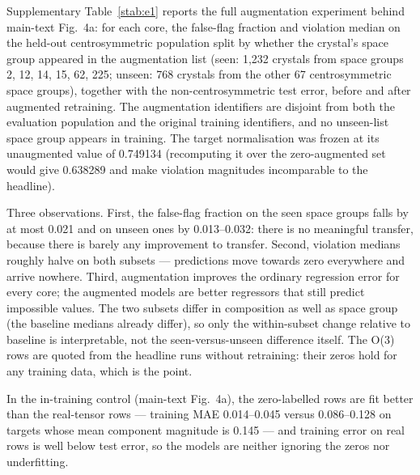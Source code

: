 Supplementary Table~\ref{stab:e1} reports the full augmentation experiment behind main-text Fig.~4a: for each core, the false-flag fraction and violation median on the held-out centrosymmetric population split by whether the crystal's space group appeared in the augmentation list (seen: 1,232 crystals from space groups 2, 12, 14, 15, 62, 225; unseen: 768 crystals from the other 67 centrosymmetric space groups), together with the non-centrosymmetric test error, before and after augmented retraining. The augmentation identifiers are disjoint from both the evaluation population and the original training identifiers, and no unseen-list space group appears in training. The target normalisation was frozen at its unaugmented value of 0.749134 (recomputing it over the zero-augmented set would give 0.638289 and make violation magnitudes incomparable to the headline).

Three observations. First, the false-flag fraction on the seen space groups falls by at most 0.021 and on unseen ones by 0.013--0.032: there is no meaningful transfer, because there is barely any improvement to transfer. Second, violation medians roughly halve on both subsets --- predictions move towards zero everywhere and arrive nowhere. Third, augmentation improves the ordinary regression error for every core; the augmented models are better regressors that still predict impossible values. The two subsets differ in composition as well as space group (the baseline medians already differ), so only the within-subset change relative to baseline is interpretable, not the seen-versus-unseen difference itself. The O(3) rows are quoted from the headline runs without retraining: their zeros hold for any training data, which is the point.

In the in-training control (main-text Fig.~4a), the zero-labelled rows are fit better than the real-tensor rows --- training MAE 0.014--0.045 versus 0.086--0.128 on targets whose mean component magnitude is 0.145 --- and training error on real rows is well below test error, so the models are neither ignoring the zeros nor underfitting.

